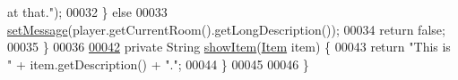 \begin{DoxyCode}
{       at that."});
00032         \} \textcolor{keywordflow}{else}
00033             \hyperlink{classCommand_a715709d8f0ab65879d79ad1725c96f17}{setMessage}(player.getCurrentRoom().getLongDescription());
00034         \textcolor{keywordflow}{return} \textcolor{keyword}{false};
00035     \}
00036 
\hypertarget{LookCommand_8java_source_l00042}{}\hyperlink{classLookCommand_ad96c354dee73acf189f99e988a796bc7}{00042}     \textcolor{keyword}{private} String \hyperlink{classLookCommand_ad96c354dee73acf189f99e988a796bc7}{showItem}(\hyperlink{classItem}{Item} item) \{
00043         \textcolor{keywordflow}{return} \textcolor{stringliteral}{"This is "} + item.getDescription() + \textcolor{stringliteral}{"."};
00044     \}
00045 
00046 \}
\end{DoxyCode}
